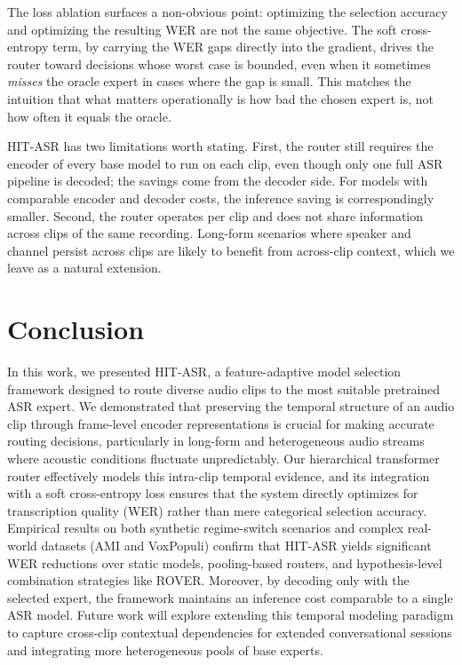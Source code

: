 \documentclass[journal]{IEEEtran}
\begin{document}
The loss ablation surfaces a non-obvious point: optimizing the
selection accuracy and optimizing the resulting WER are not the
same objective. The soft cross-entropy term, by carrying the WER
gaps directly into the gradient, drives the router toward decisions
whose worst case is bounded, even when it sometimes \emph{misses}
the oracle expert in cases where the gap is small. This matches the
intuition that what matters operationally is how bad the chosen
expert is, not how often it equals the oracle.

HIT-ASR has two limitations worth stating. First, the
router still requires the encoder of every base model to run on each
clip, even though only one full ASR pipeline is decoded; the savings
come from the decoder side. For models with comparable encoder and
decoder costs, the inference saving is correspondingly smaller.
Second, the router operates per clip and does not share information
across clips of the same recording. Long-form scenarios where speaker
and channel persist across clips are likely to benefit from
across-clip context, which we leave as a natural extension.

\section{Conclusion}
\label{sec:conclusion}

In this work, we presented HIT-ASR, a feature-adaptive model selection framework designed to route diverse audio clips to the most suitable pretrained ASR expert. We demonstrated that preserving the temporal structure of an audio clip through frame-level encoder representations is crucial for making accurate routing decisions, particularly in long-form and heterogeneous audio streams where acoustic conditions fluctuate unpredictably. Our hierarchical transformer router effectively models this intra-clip temporal evidence, and its integration with a soft cross-entropy loss ensures that the system directly optimizes for transcription quality (WER) rather than mere categorical selection accuracy. Empirical results on both synthetic regime-switch scenarios and complex real-world datasets (AMI and VoxPopuli) confirm that HIT-ASR yields significant WER reductions over static models, pooling-based routers, and hypothesis-level combination strategies like ROVER. Moreover, by decoding only with the selected expert, the framework maintains an inference cost comparable to a single ASR model. Future work will explore extending this temporal modeling paradigm to capture cross-clip contextual dependencies for extended conversational sessions and integrating more heterogeneous pools of base experts.



\end{document}
